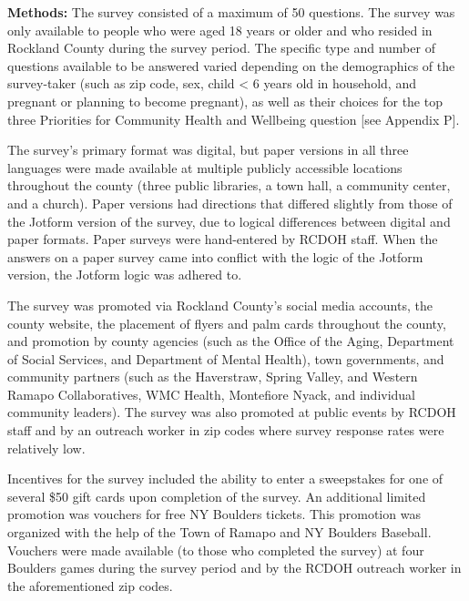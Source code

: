 \documentclass[
  english,
  letterpaper,
]{report}
\begin{document}
\textbf{Methods:} The survey consisted of a maximum of 50 questions. The
survey was only available to people who were aged 18 years or older and
who resided in Rockland County during the survey period. The specific
type and number of questions available to be answered varied depending
on the demographics of the survey-taker (such as zip code, sex, child
\textless{} 6 years old in household, and pregnant or planning to become
pregnant), as well as their choices for the top three Priorities for
Community Health and Wellbeing question {[}see Appendix P{]}.

The survey's primary format was digital, but paper versions in all three
languages were made available at multiple publicly accessible locations
throughout the county (three public libraries, a town hall, a community
center, and a church). Paper versions had directions that differed
slightly from those of the Jotform version of the survey, due to logical
differences between digital and paper formats. Paper surveys were
hand-entered by RCDOH staff. When the answers on a paper survey came
into conflict with the logic of the Jotform version, the Jotform logic
was adhered to.

The survey was promoted via Rockland County's social media accounts, the
county website, the placement of flyers and palm cards throughout the
county, and promotion by county agencies (such as the Office of the
Aging, Department of Social Services, and Department of Mental Health),
town governments, and community partners (such as the Haverstraw, Spring
Valley, and Western Ramapo Collaboratives, WMC Health, Montefiore Nyack,
and individual community leaders). The survey was also promoted at
public events by RCDOH staff and by an outreach worker in zip codes
where survey response rates were relatively low.

Incentives for the survey included the ability to enter a sweepstakes
for one of several \$50 gift cards upon completion of the survey. An
additional limited promotion was vouchers for free NY Boulders tickets.
This promotion was organized with the help of the Town of Ramapo and NY
Boulders Baseball. Vouchers were made available (to those who completed
the survey) at four Boulders games during the survey period and by the
RCDOH outreach worker in the aforementioned zip codes.
\end{document}
